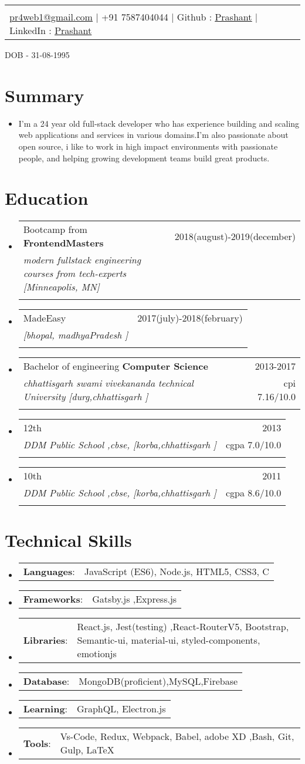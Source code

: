 \documentclass[letterpaper,11pt]{article}
\makeatletter
\newcommand{\sectionStart}{
  \begin{itemize}[label={},leftmargin=0in]
}
\newcommand{\sectionEnd}{
  \end{itemize}
}
\newcommand{\head}[9]{
  \noindent
  \begin{tabular*}{\textwidth}{l@{\extracolsep{\fill}}r}
    \centerline{
      \textbf{\href{#1}{\color{black}{\LARGE {\underline{#2}}}}}
    }
    \vspace{5pt}\\
    \centerline{
      \href{mailto:#3}{\underline{#3}} $\mid$
      #4 $\mid$
      #5 : \href{#6}{\underline{#7}} $\mid$
      #8 : \href{#9}{\underline{#7}}
    }
  \end{tabular*}
  \vspace{-10pt}
}
\newcommand{\summaryText}[1]{
  \item
  \begin{addmargin}[7pt]{0pt}
    {#1}
  \end{addmargin}
}
\newcommand{\educationItem}[5]{
  \vspace{-1pt}
  \item
  \begin{tabular*}{\textwidth}{l@{\extracolsep{\fill}}r@{}}
    {#1  \textbf{#2}}  & {#3}\\
    {\textit{#4}} & {#5}\\\vspace{-18pt}
  \end{tabular*}
  \vspace{-5pt}
}
\newcommand{\skillItem}[2]{
  \vspace{-1pt}
  \item
  \begin{tabular*}{1.0\textwidth}{l@{}l@{}}
    {\textbf{#1}: } & {#2}
  \end{tabular*}\vspace{-17pt}
}
\makeatother
\begin{document}
\head
  {http://prashantrawal.in}
  {Prashant Rawal}
  {pr4web1@gmail.com}
  {+91 7587404044}
  {Github}
  {https://github.com/PrashantPR7}
  {Prashant}
  {LinkedIn}
  {https://www.linkedin.com/in/prashant-rawal-12142b117/}
   {DOB - }
  {31-08-1995}

\section{Summary}
\sectionStart
  \summaryText
  {I'm a 24 year old full-stack developer who has experience building and scaling web applications and services in various domains.I'm also passionate about open source, i like to work in high impact environments with passionate people, and helping growing development teams build great products.}
\sectionEnd

\section{Education}
\sectionStart
 \educationItem
    {Bootcamp from} 
    {FrontendMasters} 
    {2018(august)-2019(december)}
    {modern fullstack engineering courses from tech-experts [Minneapolis, MN]} 
    {}
 \educationItem
    {MadeEasy} 
    {} 
    {2017(july)-2018(february)}
    { [bhopal, madhyaPradesh ]} 
    {}
  \educationItem
    {Bachelor of engineering} 
    {Computer Science} 
    {2013-2017}
    {chhattisgarh swami vivekananda technical University [durg,chhattisgarh ]} 
    {cpi 7.16/10.0}
     \educationItem
    {12th } 
    {} 
    {2013}
    {DDM Public School ,{cbse}, [korba,chhattisgarh ]} 
    {cgpa 7.0/10.0}
    \educationItem
    {10th } 
    {} 
    {2011}
    {DDM Public School ,{cbse}, [korba,chhattisgarh ]} 
    { cgpa 8.6/10.0}
\sectionEnd

\section{Technical Skills}
\sectionStart
  \skillItem
    {Languages}
    {JavaScript (ES6), Node.js, HTML5, CSS3, C }
  \skillItem
    {Frameworks}
    {Gatsby.js ,Express.js}
     \skillItem
    {Libraries}
        {React.js, Jest(testing) ,React-RouterV5, Bootstrap,
    Semantic-ui, material-ui, styled-components, emotionjs}
    \skillItem
    {Database}
        {MongoDB(proficient),MySQL,Firebase}
    \skillItem
    {Learning}
        {GraphQL, Electron.js}
  \skillItem
    {Tools}
    { Vs-Code, Redux, Webpack, Babel, adobe XD ,Bash, Git, Gulp, \LaTeX\ }
  \vspace{3pt}
\sectionEnd
\end{document}
